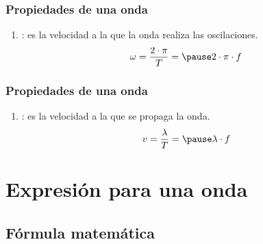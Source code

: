 \documentclass[14pt]{beamer}
\begin{document}
\begin{frame}
\frametitle{Propiedades de una onda}
\begin{enumerate}[<+->]
\conti
\item {}: es la velocidad a la que la onda realiza las oscilaciones.
\pause
\begin{eqnarray*}
\begin{aligned}
\omega = \dfrac{2 \cdot \pi}{T} = \pause 2 \cdot \pi \cdot f
\end{aligned}
\end{eqnarray*}
\seti
\end{enumerate}
\end{frame}
\begin{frame}
\frametitle{Propiedades de una onda}
\begin{enumerate}[<+->]
\conti
\item {}: es la velocidad a la que se propaga la onda.
\pause
\begin{eqnarray*}
\begin{aligned}
v = \dfrac{\lambda}{T} = \pause \lambda \cdot f
\end{aligned}
\end{eqnarray*}
\end{enumerate}
\end{frame}

\section{Expresión para una onda}
\subsection{Fórmula matemática}
\end{document}
